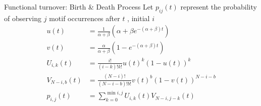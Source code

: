 \documentclass[10pt]{beamer}
\begin{document}
\begin{frame}[fragile]{Functional turnover: Birth \& Death Process}
Let $p_{ij}(t)$ represent the probability of observing $j$ motif occurrences after $t$ , initial $i$
\begin{align*}
u(t) &= \frac{1}{\alpha+\beta} (\alpha + \beta e^{-(\alpha+\beta)t})\\
v(t) &= \frac{\alpha}{\alpha+\beta} (1-e^{-(\alpha+\beta)t})\\
U_{i,k}(t) &= \frac{i!}{(i-k)!k!}{u(t)}^k(1-u(t))^k\\
V_{N-i,b}(t) &= \frac{(N-i)!}{(N-i-b)!b!} {v(t)}^b (1-v(t))^{N-i-b}\\
p_{i,j}(t) &= \sum_{k=0}^{\min{i,j}} U_{i,k}(t) V_{N-i,j-k}(t)
\end{align*}
\end{frame} 

\end{document}
